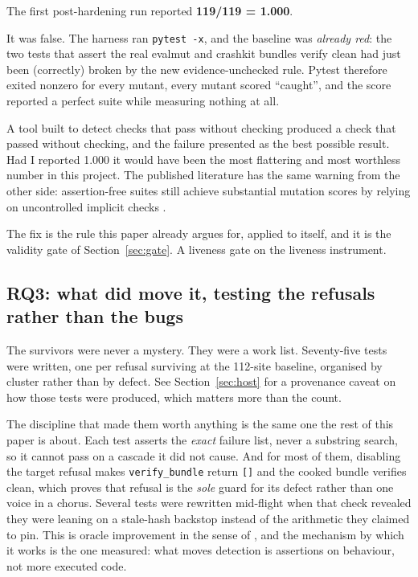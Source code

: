 \documentclass[11pt]{article}
\begin{document}
The first post-hardening run reported \textbf{119/119 = 1.000}.

It was false. The harness ran \texttt{pytest -x}, and the baseline was \emph{already red}:
the two tests that assert the real evalmut and crashkit bundles verify clean had just been
(correctly) broken by the new evidence-unchecked rule. Pytest therefore exited nonzero for
every mutant, every mutant scored ``caught'', and the score reported a perfect suite while
measuring nothing at all.

A tool built to detect checks that pass without checking produced a check that passed without
checking, and the failure presented as the best possible result. Had I reported 1.000 it
would have been the most flattering and most worthless number in this project. The published
literature has the same warning from the other side: assertion-free suites still achieve
substantial mutation scores by relying on uncontrolled implicit checks
\citep{schuler2011checkedcov}.

The fix is the rule this paper already argues for, applied to itself, and it is the validity
gate of Section~\ref{sec:gate}. A liveness gate on the liveness instrument.

\subsection{RQ3: what did move it, testing the refusals rather than the bugs}
\label{sec:liveness-tests}

The survivors were never a mystery. They were a work list. Seventy-five tests were written,
one per refusal surviving at the 112-site baseline, organised by cluster rather than by
defect. See Section~\ref{sec:host} for a provenance caveat on how those tests were produced,
which matters more than the count.

The discipline that made them worth anything is the same one the rest of this paper is about.
Each test asserts the \emph{exact} failure list, never a substring search, so it cannot pass
on a cascade it did not cause. And for most of them, disabling the target refusal makes
\texttt{verify\_bundle} return \texttt{[]} and the cooked bundle verifies clean, which proves
that refusal is the \emph{sole} guard for its defect rather than one voice in a chorus.
Several tests were rewritten mid-flight when that check revealed they were leaning on a
stale-hash backstop instead of the arithmetic they claimed to pin. This is oracle improvement
in the sense of \citet{jahangirova2016oracle}, and the mechanism by which it works is the one
\citet{zhang2015assertions} measured: what moves detection is assertions on behaviour, not
more executed code.
\end{document}
